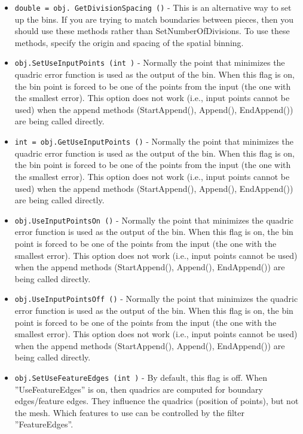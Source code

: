 \begin{itemize}
\item  \verb|double = obj. GetDivisionSpacing ()| -  This is an alternative way to set up the bins.  If you are trying to match
 boundaries between pieces, then you should use these methods rather than
 SetNumberOfDivisions. To use these methods, specify the origin and spacing
 of the spatial binning.

\item  \verb|obj.SetUseInputPoints (int )| -  Normally the point that minimizes the quadric error function is used as
 the output of the bin.  When this flag is on, the bin point is forced to
 be one of the points from the input (the one with the smallest
 error). This option does not work (i.e., input points cannot be used)
 when the append methods (StartAppend(), Append(), EndAppend()) are being
 called directly.

\item  \verb|int = obj.GetUseInputPoints ()| -  Normally the point that minimizes the quadric error function is used as
 the output of the bin.  When this flag is on, the bin point is forced to
 be one of the points from the input (the one with the smallest
 error). This option does not work (i.e., input points cannot be used)
 when the append methods (StartAppend(), Append(), EndAppend()) are being
 called directly.

\item  \verb|obj.UseInputPointsOn ()| -  Normally the point that minimizes the quadric error function is used as
 the output of the bin.  When this flag is on, the bin point is forced to
 be one of the points from the input (the one with the smallest
 error). This option does not work (i.e., input points cannot be used)
 when the append methods (StartAppend(), Append(), EndAppend()) are being
 called directly.

\item  \verb|obj.UseInputPointsOff ()| -  Normally the point that minimizes the quadric error function is used as
 the output of the bin.  When this flag is on, the bin point is forced to
 be one of the points from the input (the one with the smallest
 error). This option does not work (i.e., input points cannot be used)
 when the append methods (StartAppend(), Append(), EndAppend()) are being
 called directly.

\item  \verb|obj.SetUseFeatureEdges (int )| -  By default, this flag is off.  When ''UseFeatureEdges'' is on, then
 quadrics are computed for boundary edges/feature edges.  They influence
 the quadrics (position of points), but not the mesh.  Which features to
 use can be controlled by the filter ''FeatureEdges''.


\end{itemize}
